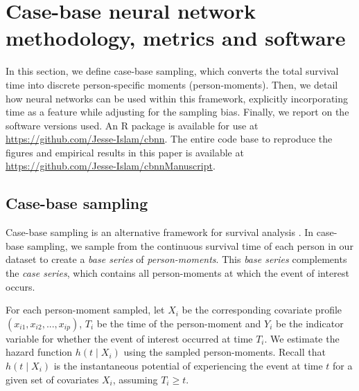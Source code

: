 \documentclass[APA,LATO1COL]{WileyNJD-v2}
\begin{document}

\hypertarget{methods}{%
\section{Case-base neural network methodology, metrics and
software}\label{methods}}

In this section, we define case-base sampling, which converts the total
survival time into discrete person-specific moments (person-moments).
Then, we detail how neural networks can be used within this framework,
explicitly incorporating time as a feature while adjusting for the
sampling bias. Finally, we report on the software versions used. An R
package is available for use at
\url{https://github.com/Jesse-Islam/cbnn}. The entire code base to
reproduce the figures and empirical results in this paper is available
at \url{https://github.com/Jesse-Islam/cbnnManuscript}.

\hypertarget{case-base-sampling}{%
\subsection{Case-base sampling}\label{case-base-sampling}}

Case-base sampling is an alternative framework for survival analysis
\citep{hanley2009}. In case-base sampling, we sample from the continuous
survival time of each person in our dataset to create a \emph{base
series} of \emph{person-moments}. This \emph{base series} complements
the \emph{case series}, which contains all person-moments at which the
event of interest occurs.

For each person-moment sampled, let \(X_i\) be the corresponding
covariate profile \(\left(x_{i1},x_{i2},...,x_{ip} \right)\), \(T_i\) be
the time of the person-moment and \(Y_i\) be the indicator variable for
whether the event of interest occurred at time \(T_i\). We estimate the
hazard function \(h(t \mid X_i)\) using the sampled person-moments.
Recall that \(h(t \mid X_i)\) is the instantaneous potential of
experiencing the event at time \(t\) for a given set of covariates
\(X_i\), assuming \(T_i \geq t\).
\end{document}
